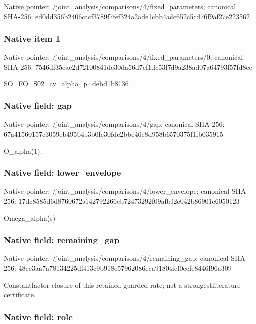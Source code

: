 \documentclass[10pt,a4paper]{article}
\begin{document}
Native pointer: /joint\_analysis/comparis\allowbreak{}ons/4/fixed\_parameters; canonical SHA-256: ed0dd356b2406cacf3789f7f\allowbreak{}ef324a2ade1cbb4adc652c5c\allowbreak{}d76f9af27e223562



\subsubsection{Native item 1}


Native pointer: /joint\_analysis/comparis\allowbreak{}ons/4/fixed\_parameters/0; canonical SHA-256: 7546df35eae2d72100841de3\allowbreak{}0da56d7cf1dc53f7d9a238ad\allowbreak{}07a64793f57fd8ee


SO\_FO\_S02\_cv\_alpha\_p\_debd1b8136


\subsubsection{Native field: gap}


Native pointer: /joint\_analysis/comparisons/4/gap; canonical SHA-256: 67a41560157c3059eb495b4b\allowbreak{}3b0fe30fdc2bbe46e8d958b6\allowbreak{}570375f1fb035915


O\_alpha(1).


\subsubsection{Native field: lower\_envelope}


Native pointer: /joint\_analysis/comparis\allowbreak{}ons/4/lower\_envelope; canonical SHA-256: 17dc8585d6d8760672a14279\allowbreak{}2266eb72473292f09afb02e0\allowbreak{}42b86901e6050123


Omega\_alpha(s)


\subsubsection{Native field: remaining\_gap}


Native pointer: /joint\_analysis/comparis\allowbreak{}ons/4/remaining\_gap; canonical SHA-256: 48ce3aa7a78134225df413c9\allowbreak{}b918e57962086eca91804fef\allowbreak{}0ecfe8446f96a309


Constantfactor closure of this retained guarded rate; not a strongestliterature certificate.


\subsubsection{Native field: role}
\end{document}
